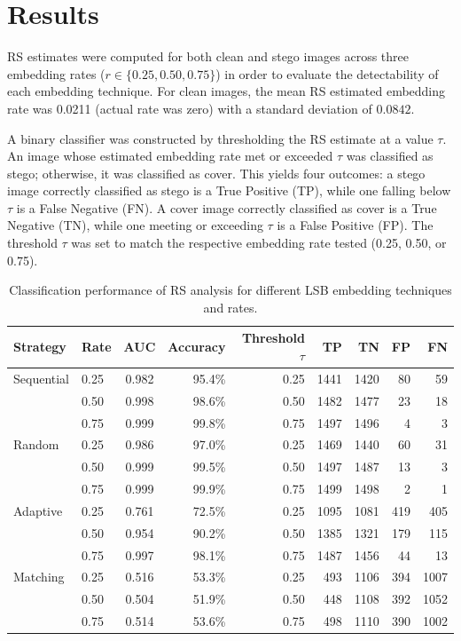 \chapter{Results} \label{cha:results}

RS estimates were computed for both clean and stego images across three embedding rates ($r \in \{0.25, 0.50, 0.75\}$) in order to evaluate the detectability of each embedding technique. 
For clean images, the mean RS estimated embedding rate was 0.0211 (actual rate was zero) with a standard deviation of $0.0842$. 

A binary classifier was constructed by thresholding the RS estimate at a value $\tau$. 
An image whose estimated embedding rate met or exceeded $\tau$ was classified as stego; otherwise, it was classified as cover. 
This yields four outcomes: a stego image correctly classified as stego is a True Positive (TP), while one falling below $\tau$ is a False Negative (FN). A cover image correctly classified as cover is a True Negative (TN), while one meeting or exceeding $\tau$ is a False Positive (FP). 
The threshold $\tau$ was set to match the respective embedding rate tested (0.25, 0.50, or 0.75).

\begin{table}[ht]
  \centering
  \caption{Classification performance of RS analysis for different LSB embedding techniques and rates.}
  \label{tab:rs_analysis_results}
  \small
  \begin{tabular}{llcrrrrrr}
    \toprule
    Strategy & Rate & AUC & Accuracy & Threshold $\tau$ & TP & TN & FP & FN \\
    \midrule
    Sequential & 0.25 & 0.982 & 95.4\% & 0.25& 1441 & 1420 & 80 & 59 \\ 
               & 0.50 & 0.998 & 98.6\% & 0.50& 1482 & 1477 & 23 & 18 \\ 
               & 0.75 & 0.999 & 99.8\% & 0.75& 1497 & 1496 & 4 & 3 \\ 
    \midrule
    Random     & 0.25 & 0.986 & 97.0\% & 0.25& 1469 & 1440 & 60 & 31 \\ 
               & 0.50 & 0.999 & 99.5\% & 0.50& 1497 & 1487 & 13 & 3 \\  
               & 0.75 & 0.999 & 99.9\% & 0.75& 1499 & 1498 & 2 & 1 \\  
    \midrule
    Adaptive   & 0.25 & 0.761 & 72.5\% & 0.25& 1095 & 1081 & 419 & 405 \\ 
               & 0.50 & 0.954 & 90.2\% & 0.50& 1385 & 1321 & 179 & 115 \\ 
               & 0.75 & 0.997 & 98.1\% & 0.75& 1487 & 1456 & 44 & 13 \\  
    \midrule
    Matching   & 0.25 & 0.516 & 53.3\% & 0.25& 493 & 1106 & 394 & 1007 \\ 
               & 0.50 & 0.504 & 51.9\% & 0.50& 448 & 1108 & 392 & 1052 \\ 
               & 0.75 & 0.514 & 53.6\% & 0.75& 498 & 1110 & 390 & 1002 \\ 
    \bottomrule
  \end{tabular}
\end{table}

